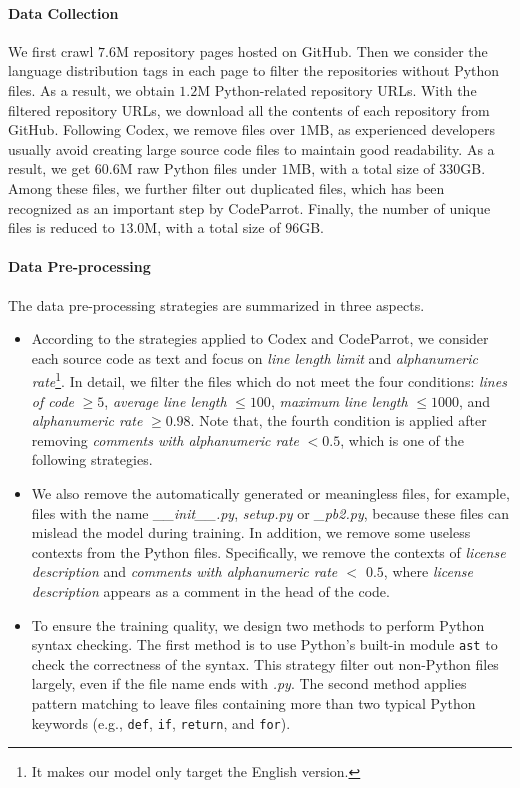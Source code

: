 \documentclass{article}
\begin{document}
\paragraph{Data Collection}
We first crawl $7.6$M repository pages hosted on GitHub. Then we consider the language distribution tags in each page to filter the repositories without Python files. As a result, we obtain $1.2$M Python-related repository URLs. With the filtered repository URLs, we download all the contents of each repository from GitHub. Following Codex, we remove files over $1$MB, as experienced developers usually avoid creating large source code files to maintain good readability. As a result, we get $60.6$M raw Python files under $1$MB, with a total size of $330$GB. Among these files, we further filter out duplicated files, which has been recognized as an important step by CodeParrot.
Finally, the number of unique files is reduced to $13.0$M, with a total size of $96$GB.

\paragraph{Data Pre-processing}
The data pre-processing strategies are summarized in three aspects.
\begin{itemize}
    \item According to the strategies applied to Codex and CodeParrot, we consider each source code as text and focus on \textit{line length limit} and \textit{alphanumeric rate}\footnote{It makes our model only target the English version.}. In detail, we filter the files which do not meet the four conditions: \textit{lines of code} $\ge 5$, \textit{average line length} $\le 100$, \textit{maximum line length} $\le 1000$, and \textit{alphanumeric rate} $\ge 0.98$. Note that, the fourth condition is applied after removing \textit{comments with alphanumeric rate} $< 0.5$, which is one of the following strategies.
    
    \item We also remove the automatically generated or meaningless files, for example, files with the name \textit{\_\_init\_\_.py}, \textit{setup.py} or \textit{\_pb2.py}, because these files can mislead the model during training. In addition, we remove some useless contexts from the Python files. Specifically, we remove the contexts of \textit{license description} and \textit{comments with alphanumeric rate $<$ $0.5$}, where \textit{license description} appears as a comment in the head of the code.
    \item 
    To ensure the training quality, we design two methods to perform Python syntax checking. The first method is to use Python's built-in module \verb|ast| to check the correctness of the syntax. This strategy filter out non-Python files largely, even if the file name ends with \textit{.py}. The second method applies pattern matching to leave files containing more than two typical Python keywords (e.g., \verb|def|, \verb|if|, \verb|return|, and \verb|for|).
\end{itemize}
\end{document}
